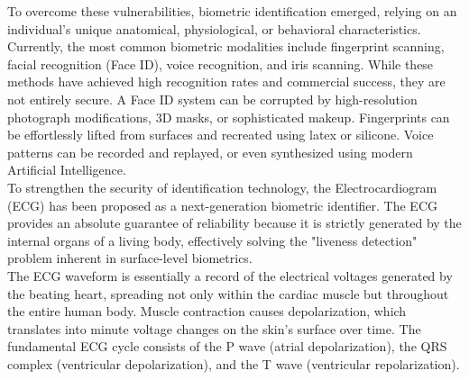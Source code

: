 \documentclass[12pt,a4paper]{report}
\begin{document}
To overcome these vulnerabilities, biometric identification emerged, relying on an individual's unique anatomical, physiological, or behavioral characteristics. Currently, the most common biometric modalities include fingerprint scanning, facial recognition (Face ID), voice recognition, and iris scanning. While these methods have achieved high recognition rates and commercial success, they are not entirely secure. A Face ID system can be corrupted by high-resolution photograph modifications, 3D masks, or sophisticated makeup. Fingerprints can be effortlessly lifted from surfaces and recreated using latex or silicone. Voice patterns can be recorded and replayed, or even synthesized using modern Artificial Intelligence. \\

To strengthen the security of identification technology, the Electrocardiogram (ECG) has been proposed as a next-generation biometric identifier. The ECG provides an absolute guarantee of reliability because it is strictly generated by the internal organs of a living body, effectively solving the "liveness detection" problem inherent in surface-level biometrics. \\

The ECG waveform is essentially a record of the electrical voltages generated by the beating heart, spreading not only within the cardiac muscle but throughout the entire human body. Muscle contraction causes depolarization, which translates into minute voltage changes on the skin's surface over time. The fundamental ECG cycle consists of the P wave (atrial depolarization), the QRS complex (ventricular depolarization), and the T wave (ventricular repolarization). \\

\newpage
\end{document}
